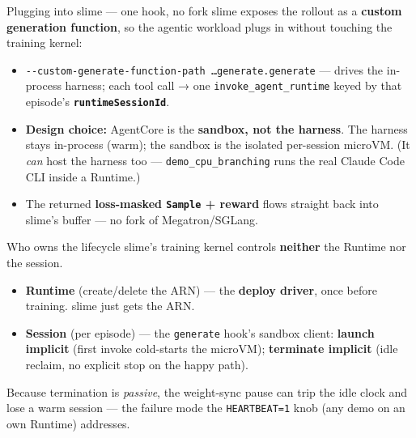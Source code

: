 \documentclass[
  10pt,
  ignorenonframetext,
  aspectratio=169,
  t]{beamer}
\providecommand{\tightlist}{%
  \setlength{\itemsep}{0pt}\setlength{\parskip}{0pt}}
\begin{document}
\begin{frame}{Plugging into slime --- one hook, no fork}
\protect\hypertarget{plugging-into-slime-one-hook-no-fork}{}
slime exposes the rollout as a \textbf{custom generation function}, so
the agentic workload plugs in without touching the training kernel:

\begin{itemize}
\tightlist
\item
  \texttt{-\/-custom-generate-function-path\ …generate.generate} ---
  drives the in-process harness; each tool call → one
  \texttt{invoke\_agent\_runtime} keyed by that episode's
  \textbf{\texttt{runtimeSessionId}}.
\item
  \textbf{Design choice:} AgentCore is the \textbf{sandbox, not the
  harness}. The harness stays in-process (warm); the sandbox is the
  isolated per-session microVM. (It \emph{can} host the harness too ---
  \texttt{demo\_cpu\_branching} runs the real Claude Code CLI inside a
  Runtime.)
\item
  The returned \textbf{loss-masked \texttt{Sample} + reward} flows
  straight back into slime's buffer --- no fork of Megatron/SGLang.
\end{itemize}
\end{frame}

\begin{frame}{Who owns the lifecycle}
\protect\hypertarget{who-owns-the-lifecycle}{}
slime's training kernel controls \textbf{neither} the Runtime nor the
session.

\begin{itemize}
\tightlist
\item
  \textbf{Runtime} (create/delete the ARN) --- the \textbf{deploy
  driver}, once before training. slime just gets the ARN.
\item
  \textbf{Session} (per episode) --- the \texttt{generate} hook's
  sandbox client: \textbf{launch implicit} (first invoke cold-starts the
  microVM); \textbf{terminate implicit} (idle reclaim, no explicit stop
  on the happy path).
\end{itemize}

Because termination is \emph{passive}, the weight-sync pause can trip
the idle clock and lose a warm session --- the failure mode the
\texttt{HEARTBEAT=1} knob (any demo on an own Runtime) addresses.
\end{frame}
\end{document}
